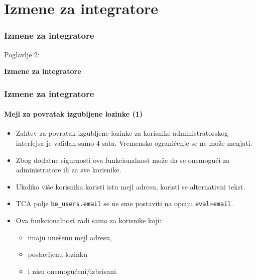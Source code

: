 %

\section{Izmene za integratore}
\begin{frame}[fragile]
	\frametitle{Izmene za integratore}

	\begin{center}\huge{Poglavlje 2:}\end{center}
	\begin{center}\huge{\color{typo3darkgrey}\textbf{Izmene za integratore}}\end{center}

\end{frame}


\begin{frame}[fragile]
	\frametitle{Izmene za integratore}
	\framesubtitle{Mejl za povratak izgubljene lozinke (1)}

	\begin{itemize}

		\item Zahtev za povratak izgubljene lozinke za korisnike administratorskog interfejsa je validan samo 4 sata.\newline
			Vremensko ograničenje se ne može menjati.
		\item Zbog dodatne sigurnosti ova funkcionalnost može da se onemogući za administratore ili za sve korisnike.
		\item Ukoliko više korisnika koristi istu mejl adresu, koristi se alternativni tekst.
		\item TCA polje \texttt{be\_users.email} se ne sme postaviti na opciju \texttt{eval=email}.

		\item Ova funkcionalnost radi samo za korisnike koji:
			\begin{itemize}
				\item imaju unešenu mejl adresu,
				\item postavljenu lozinku
				\item i nisu onemogućeni/izbrisani.
			\end{itemize}

	\end{itemize}

\end{frame}


